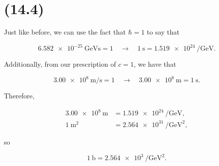 \section{(14.4)}

Just like before, we can use the fact that $\hbar=1$ to say that

\begin{equation*}
    \qty{6.582e-25}{\giga\electronvolt\second} = 1 \quad\rightarrow\quad \qty{1}{\second} = \qty{1.519e24}{\per\giga\electronvolt}.
\end{equation*}

Additionally, from our prescription of $c=1$, we have that

\begin{equation*}
    \qty{3.00e8}{\meter\per\second} = 1 \quad\rightarrow\quad \qty{3.00e8}{\meter} = \qty{1}{\second}.
\end{equation*}

Therefore,

\begin{align*}
    \qty{3.00e8}{\meter} &= \qty{1.519e24}{\per\giga\electronvolt}, \\
    \qty{1}{\meter\squared} &= \qty{2.564e31}{\per\giga\electronvolt\squared},
\end{align*}

so

\begin{equation*}
    \boxed{\qty{1}{\barn} = \qty{2.564e3}{\per\giga\electronvolt\squared}.}
\end{equation*}
